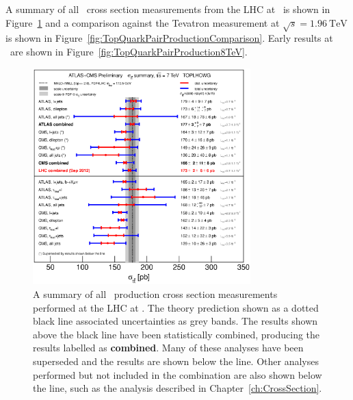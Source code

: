 {A summary of all \ttbar\ cross section measurements from the LHC at \cmsS\ is shown in Figure~\ref{fig:TopQuarkPairProductionSummaryLHC} and a comparison against the Tevatron measurement at $\sqrt{s}=\SI{1.96}{\TeV}$ is shown in Figure~\ref{fig:TopQuarkPairProductionComparison}. Early results at \cmsE\ are shown in Figure~\ref{fig:TopQuarkPairProduction8TeV}.

\begin{figure}[htbp]
  \centering
  \includegraphics[width=0.75\textwidth]{PartTopQuark/Plots/tt_xsec_7TeV.eps}
  \caption{A summary of all \ttbar\ production cross section measurements performed at the LHC at \cmsS. The theory prediction shown as a dotted black line associated uncertainties as grey bands. The results shown above the black line have been statistically combined, producing the results labelled as \textbf{combined}. Many of these analyses have been superseded and the results are shown below the line. Other analyses performed but not included in the combination are also shown below the line, such as the analysis described in Chapter~\ref{ch:CrossSection}.}
  \label{fig:TopQuarkPairProductionSummaryLHC}
\end{figure}

}
